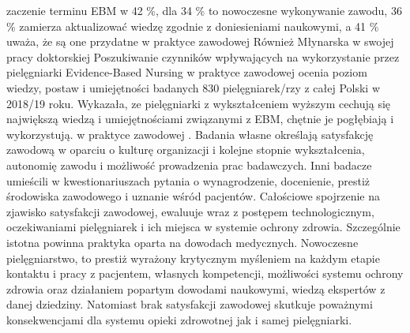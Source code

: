 \documentclass[a4paper,12pt,twoside,openany]{report}
\begin{document}
zaczenie terminu EBM w 42 \%, dla 34 \% to nowoczesne wykonywanie zawodu, 36 \% zamierza aktualizować wiedzę zgodnie z doniesieniami naukowymi, a 41 \% uważa, że są one przydatne w praktyce zawodowej \cite{gotlib} Również Młynarska w swojej pracy doktorskiej  Poszukiwanie czynników wpływających na wykorzystanie przez pielęgniarki Evidence-Based Nursing w praktyce zawodowej ocenia poziom wiedzy, postaw i umiejętności badanych 830 pielęgniarek/rzy z całej Polski  w 2018/19 roku. Wykazała, ze pielęgniarki z wykształceniem wyższym cechują się największą wiedzą i umiejętnościami związanymi z EBM, chętnie je  pogłębiają i wykorzystują. w praktyce zawodowej \cite{ EBM}. Badania własne określają satysfakcję zawodową w oparciu o kulturę organizacji i kolejne stopnie wykształcenia, autonomię zawodu i możliwość prowadzenia prac badawczych. Inni badacze umieścili w kwestionariuszach pytania o wynagrodzenie, docenienie, prestiż środowiska zawodowego i uznanie wśród pacjentów. Całościowe spojrzenie na zjawisko satysfakcji zawodowej, ewaluuje wraz z postępem technologicznym, oczekiwaniami pielęgniarek i ich miejsca w systemie ochrony zdrowia. Szczególnie istotna powinna praktyka oparta na dowodach medycznych. Nowoczesne pielęgniarstwo, to prestiż wyrażony krytycznym myśleniem na każdym etapie kontaktu i pracy z pacjentem, własnych kompetencji, możliwości systemu ochrony zdrowia oraz działaniem popartym dowodami naukowymi, wiedzą ekspertów z danej dziedziny. Natomiast brak satysfakcji zawodowej skutkuje poważnymi konsekwencjami dla systemu opieki zdrowotnej jak i samej pielęgniarki.

\end{document}
